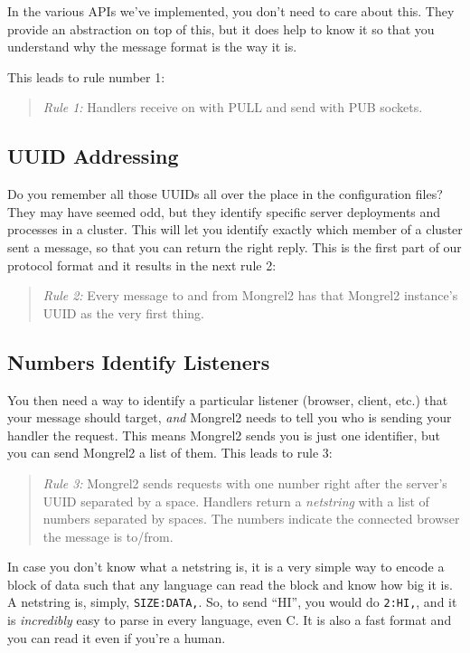 In the various APIs we've implemented, you don't need to care about this.
They provide an abstraction on top of this, but it does help to know it
so that you understand why the message format is the way it is.

This leads to rule number 1:

\begin{quote}
\emph{Rule 1:} Handlers receive on with PULL and send with PUB sockets.
\end{quote}

\subsection{UUID Addressing}

Do you remember all those UUIDs all over the place in the configuration files?
They may have seemed odd, but they identify specific server deployments and
processes in a cluster.  This will let you identify exactly which member of a
cluster sent a message, so that you can return the right reply.  This is the
first part of our protocol format and it results in the next rule 2:

\begin{quote}
\emph{Rule 2:} Every message to and from Mongrel2 has that Mongrel2 instance's
UUID as the very first thing.
\end{quote}

\subsection{Numbers Identify Listeners}

You then need a way to identify a particular listener (browser, client, etc.)
that your message should target, \emph{and} Mongrel2 needs to tell you who is
sending your handler the request.  This means Mongrel2 sends you is just one
identifier, but you can send Mongrel2 a list of them.  This leads to rule 3:

\begin{quote}
\emph{Rule 3:} Mongrel2 sends requests with one number right after the server's
UUID separated by a space.  Handlers return a \emph{netstring} with a list of
numbers separated by spaces.  The numbers indicate the connected browser the
message is to/from.
\end{quote}

In case you don't know what a netstring is, it is a very simple way to encode a
block of data such that any language can read the block and know how big it is.
A netstring is, simply, \verb|SIZE:DATA,|. So, to send ``HI'', you would do
\verb|2:HI,|, and it is \emph{incredibly} easy to parse in every language, even
C.  It is also a fast format and you can read it even if you're a human.


